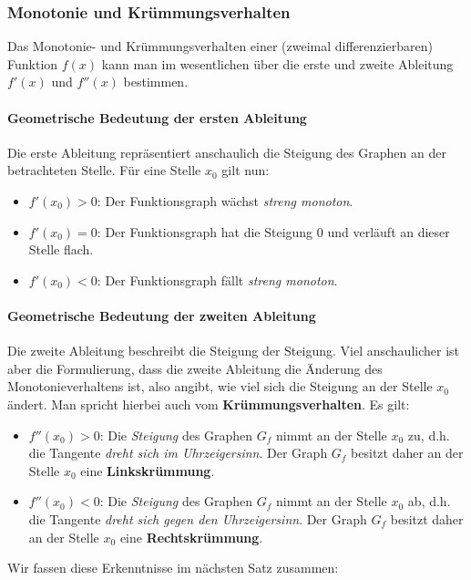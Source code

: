 \documentclass[ngerman, 12pt]{nssheetxea}
\begin{document}
\subsubsection{Monotonie und Krümmungsverhalten}

Das Monotonie- und Krümmungsverhalten einer (zweimal differenzierbaren) Funktion $f(x)$ kann man im wesentlichen über die erste und zweite Ableitung $f'(x)$ und $f''(x)$ bestimmen.
\paragraph{Geometrische Bedeutung der ersten Ableitung} Die erste Ableitung repräsentiert anschaulich die Steigung des Graphen an der betrachteten Stelle. Für eine Stelle $x_0$ gilt nun:
\begin{itemize}
\item $f'(x_0)>0$: Der Funktionsgraph wächst \textit{streng monoton}.
\item $f'(x_0)=0$: Der Funktionsgraph hat die Steigung $0$ und verläuft an dieser Stelle flach.
\item $f'(x_0)<0$: Der Funktionsgraph fällt \textit{streng monoton}.
\end{itemize}
\paragraph{Geometrische Bedeutung der zweiten Ableitung} Die zweite Ableitung beschreibt \glqq die Steigung der Steigung\grqq. Viel anschaulicher ist aber die Formulierung, dass die zweite Ableitung die Änderung des Monotonieverhaltens ist, also angibt, wie viel sich die Steigung an der Stelle $x_0$ ändert. Man spricht hierbei auch vom \textbf{Krümmungsverhalten}. Es gilt:

\begin{itemize}
\item $f''(x_0)>0$: Die \textit{Steigung} des Graphen $G_f$ nimmt an der Stelle $x_0$ zu, d.h. die Tangente \textit{dreht sich im Uhrzeigersinn}. Der Graph $G_f$ besitzt daher an der Stelle $x_0$ eine \textbf{Linkskrümmung}.
\item $f''(x_0)<0$: Die \textit{Steigung} des Graphen $G_f$ nimmt an der Stelle $x_0$ ab, d.h. die Tangente \textit{dreht sich gegen den Uhrzeigersinn}. Der Graph $G_f$ besitzt daher an der Stelle $x_0$ eine \textbf{Rechtskrümmung}.
\end{itemize}
Wir fassen diese Erkenntnisse im nächsten Satz zusammen:
\end{document}
